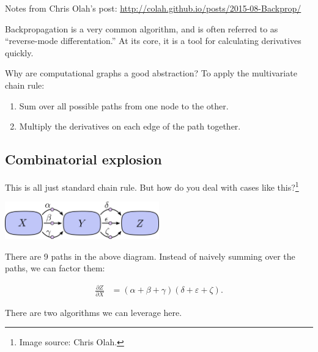 Notes from Chris Olah's post: \url{http://colah.github.io/posts/2015-08-Backprop/}

Backpropagation is a very common algorithm, and is often referred to as ``reverse-mode differentation.''  At its core, it is a tool for calculating derivatives quickly.

Why are computational graphs a good abstraction?  To apply the multivariate chain rule:

\begin{enumerate}
  \item Sum over all possible paths from one node to the other.
  \item Multiply the derivatives on each edge of the path together.
\end{enumerate}

\subsection{Combinatorial explosion}

This is all just standard chain rule.  But how do you deal with cases like this?\footnote{Image source: Chris Olah.}

\begin{center}
\includegraphics[width=0.5\textwidth]{img/chain-def-greek}
\end{center}

There are 9 paths in the above diagram.  Instead of naively summing over the paths, we can factor them:

\begin{align*}
  \frac{\partial Z}{\partial X} &= (\alpha + \beta + \gamma)(\delta + \varepsilon + \zeta).
\end{align*}

There are two algorithms we can leverage here.

